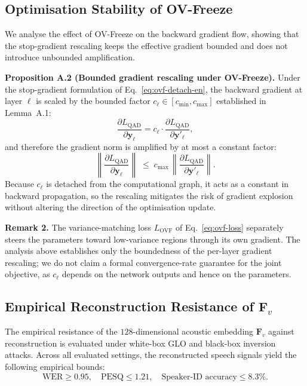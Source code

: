 \documentclass[a4paper,fleqn]{cas-sc}
\begin{document}
\subsection{Optimisation Stability of OV-Freeze}
\label{app:lipschitz}

We analyse the effect of OV-Freeze on the backward gradient flow, showing that the stop-gradient rescaling keeps the effective gradient bounded and does not introduce unbounded amplification.

\medskip
\noindent\textbf{Proposition A.2 (Bounded gradient rescaling under OV-Freeze).}
Under the stop-gradient formulation of Eq.~\eqref{eq:ovf-detach-en}, the backward gradient at layer $\ell$ is scaled by the bounded factor $c_\ell \in [c_{\min}, c_{\max}]$ established in Lemma~A.1:
\[
\frac{\partial L_{\mathrm{QAD}}}{\partial\bm{y}_\ell}
= c_\ell \cdot \frac{\partial L_{\mathrm{QAD}}}{\partial\bm{y}'_\ell},
\]
and therefore the gradient norm is amplified by at most a constant factor:
\[
\left\|\frac{\partial L_{\mathrm{QAD}}}{\partial\bm{y}_\ell}\right\|
\;\le\; c_{\max}\,\left\|\frac{\partial L_{\mathrm{QAD}}}{\partial\bm{y}'_\ell}\right\|.
\]
Because $c_\ell$ is detached from the computational graph, it acts as a constant in backward propagation, so the rescaling mitigates the risk of gradient explosion without altering the direction of the optimisation update.

\medskip
\noindent\textbf{Remark 2.}
The variance-matching loss $L_{\mathrm{OVF}}$ of Eq.~\eqref{eq:ovf-loss} separately steers the parameters toward low-variance regions through its own gradient. The analysis above establishes only the boundedness of the per-layer gradient rescaling; we do not claim a formal convergence-rate guarantee for the joint objective, as $c_\ell$ depends on the network outputs and hence on the parameters.

\subsection{Empirical Reconstruction Resistance of $\mathbf{F}_v$}
\label{app:nonrecon}

The empirical resistance of the $128$-dimensional acoustic embedding $\mathbf{F}_v$ against reconstruction is evaluated under white-box GLO and black-box inversion attacks. Across all evaluated settings, the reconstructed speech signals yield the following empirical bounds:
\[
\text{WER} \ge 0.95, \quad \text{PESQ} \le 1.21, \quad
\text{Speaker-ID accuracy} \le 8.3\%.
\]
\end{document}

